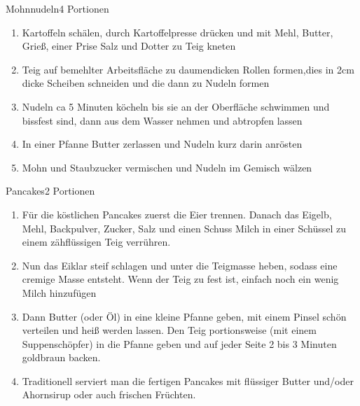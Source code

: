 \documentclass{article}
\begin{document}
\begin{recipe}{Mohnnudeln}{4 Portionen}{}


\begin{enumerate}
\item Kartoffeln schälen, durch Kartoffelpresse drücken und mit Mehl, Butter, Grieß, einer Prise Salz und Dotter zu Teig kneten
\item Teig auf bemehlter Arbeitsfläche zu daumendicken Rollen formen,dies in 2cm dicke Scheiben schneiden und die dann zu Nudeln formen
\item Nudeln ca 5 Minuten köcheln bis sie an der Oberfläche schwimmen und bissfest sind, dann aus dem Wasser nehmen und abtropfen lassen
\item In einer Pfanne Butter zerlassen und Nudeln kurz darin anrösten
\item Mohn und Staubzucker vermischen und Nudeln im Gemisch wälzen 
\end{enumerate}
\end{recipe}

\begin{recipe}{Pancakes}{2 Portionen}{}


\begin{enumerate}
\item Für die köstlichen Pancakes zuerst die Eier trennen. Danach das Eigelb, Mehl, Backpulver, Zucker, Salz und einen Schuss Milch in einer Schüssel zu einem zähflüssigen Teig verrühren.
\item Nun das Eiklar steif schlagen und unter die Teigmasse heben, sodass eine cremige Masse entsteht. Wenn der Teig zu fest ist, einfach noch ein wenig Milch hinzufügen
\item Dann Butter (oder Öl) in eine kleine Pfanne geben, mit einem Pinsel schön verteilen und heiß werden lassen. Den Teig portionsweise (mit einem Suppenschöpfer) in die Pfanne geben und auf jeder Seite 2 bis 3 Minuten goldbraun backen.
\item Traditionell serviert man die fertigen Pancakes mit flüssiger Butter und/oder Ahornsirup oder auch frischen Früchten.
\end{enumerate}
\end{recipe}
\end{document}
